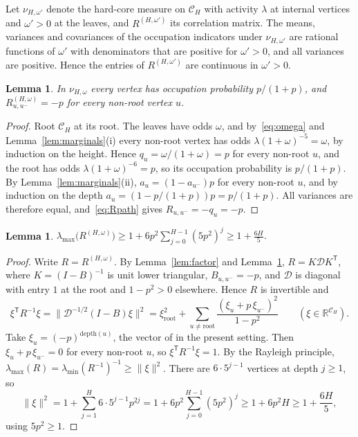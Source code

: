 \documentclass{amsart}
\numberwithin{equation}{section}
\numberwithin{table}{section}
\newtheorem{lemma}[theorem]{Lemma}
\theoremstyle{definition}
\theoremstyle{remark}
\newcommand{\R}{\mathbb{R}}
\newcommand{\lmax}{\lambda_{\max}}
\newcommand{\lmin}{\lambda_{\min}}
\begin{document}
Let $\nu_{H,\omega'}$ denote the hard-core measure on $\mathcal C_H$ with activity $\lambda$ at internal vertices and $\omega'>0$ at the leaves, and $R^{(H,\omega')}$ its correlation matrix. The means, variances and covariances of the occupation indicators under $\nu_{H,\omega'}$ are rational functions of $\omega'$ with denominators that are positive for $\omega'>0$, and all variances are positive. Hence the entries of $R^{(H,\omega')}$ are continuous in $\omega'>0$.

\begin{lemma}\label{lem:ideal}
In $\nu_{H,\omega}$ every vertex has occupation probability $p/(1+p)$, and $R^{(H,\omega)}_{u,u^-}=-p$ for every non-root vertex $u$.
\end{lemma}

\begin{proof}
Root $\mathcal C_H$ at its root. The leaves have odds $\omega$, and by~\eqref{eq:omega} and Lemma~\ref{lem:marginals}(i) every non-root vertex has odds $\lambda(1+\omega)^{-5}=\omega$, by induction on the height. Hence $q_u=\omega/(1+\omega)=p$ for every non-root $u$, and the root has odds $\lambda(1+\omega)^{-6}=p$, so its occupation probability is $p/(1+p)$. By Lemma~\ref{lem:marginals}(ii), $a_u=(1-a_{u^-})p$ for every non-root $u$, and by induction on the depth $a_u=(1-p/(1+p))p=p/(1+p)$. All variances are therefore equal, and~\eqref{eq:Rpath} gives $R_{u,u^-}=-q_u=-p$.
\end{proof}

\begin{lemma}\label{lem:blowup}
$\lmax\bigl(R^{(H,\omega)}\bigr)\ge1+6p^2\sum_{j=0}^{H-1}(5p^2)^j\ge1+\frac{6H}{5}$.
\end{lemma}

\begin{proof}
Write $R=R^{(H,\omega)}$. By Lemma~\ref{lem:factor} and Lemma~\ref{lem:ideal}, $R=K\mathcal DK^{\mathsf T}$, where $K=(I-B)^{-1}$ is unit lower triangular, $B_{u,u^-}=-p$, and $\mathcal D$ is diagonal with entry $1$ at the root and $1-p^2>0$ elsewhere. Hence $R$ is invertible and
\[
\xi^{\mathsf T}R^{-1}\xi=\bigl\|\mathcal D^{-1/2}(I-B)\xi\bigr\|^2=\xi_{\mathrm{root}}^2+\sum_{u\ne\mathrm{root}}\frac{(\xi_u+p\,\xi_{u^-})^2}{1-p^2}\qquad(\xi\in\R^{\mathcal C_H}).
\]
Take $\xi_u=(-p)^{\mathrm{depth}(u)}$, the vector of \cite[(21)]{CYYZ} in the present setting. Then $\xi_u+p\,\xi_{u^-}=0$ for every non-root $u$, so $\xi^{\mathsf T}R^{-1}\xi=1$. By the Rayleigh principle, $\lmax(R)=\lmin(R^{-1})^{-1}\ge\|\xi\|^2$. There are $6\cdot5^{j-1}$ vertices at depth $j\ge1$, so
\[
\|\xi\|^2=1+\sum_{j=1}^H6\cdot5^{j-1}p^{2j}=1+6p^2\sum_{j=0}^{H-1}(5p^2)^j\ge1+6p^2H\ge1+\frac{6H}5,
\]
using $5p^2\ge1$.
\end{proof}
\end{document}
